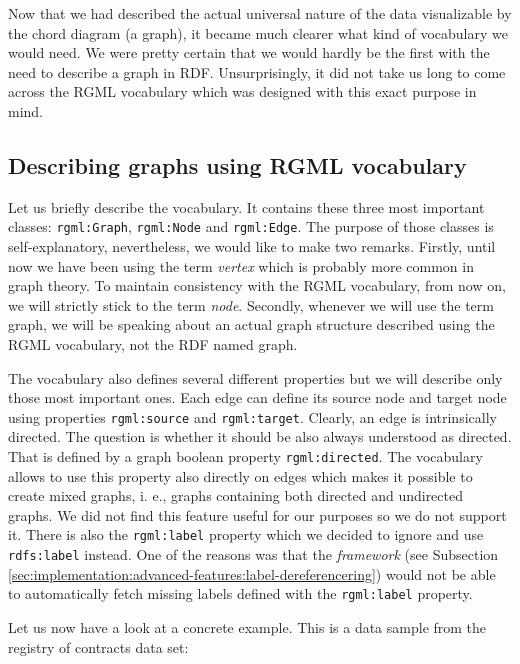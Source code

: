 Now that we had described the actual universal nature of the data visualizable by the chord diagram (a graph), it became much clearer what kind of vocabulary we would need. We were pretty certain that we would hardly be the first with the need to describe a graph in RDF. Unsurprisingly, it did not take us long to come across the RGML vocabulary which was designed with this exact purpose in mind.

\subsection{Describing graphs using RGML vocabulary}

Let us briefly describe the vocabulary. It contains these three most important classes: \texttt{rgml:Graph}, \texttt{rgml:Node} and \texttt{rgml:Edge}. The purpose of those classes is self-explanatory, nevertheless, we would like to make two remarks. Firstly, until now we have been using the term \emph{vertex} which is probably more common in graph theory. To maintain consistency with the RGML vocabulary, from now on, we will strictly stick to the term \emph{node}. Secondly, whenever we will use the term graph, we will be speaking about an actual graph structure described using the RGML vocabulary, not the RDF named graph.

The vocabulary also defines several different properties but we will describe only those most important ones. Each edge can define its source node and target node using properties \texttt{rgml:source} and \texttt{rgml:target}. Clearly, an edge is intrinsically directed. The question is whether it should be also always understood as directed. That is defined by a graph boolean property \texttt{rgml:directed}. The vocabulary allows to use this property also directly on edges which makes it possible to create mixed graphs, i. e., graphs containing both directed and undirected graphs. We did not find this feature useful for our purposes so we do not support it. There is also the \texttt{rgml:label} property which we decided to ignore and use  \texttt{rdfs:label} instead. One of the reasons was that the \emph{framework} (see Subsection \ref{sec:implementation:advanced-features:label-dereferencering}) would not be able to automatically fetch missing labels defined with the \texttt{rgml:label} property.

Let us now have a look at a concrete example. This is a data sample from the registry of contracts data set:

